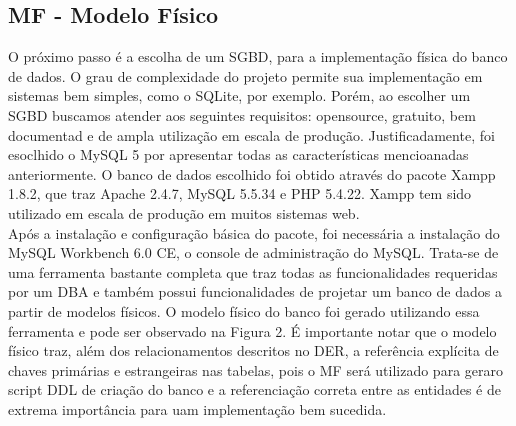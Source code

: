 \documentclass[10pt]{article}
\begin{document}
\begin{multicols}{2}
\subsection{MF - Modelo Físico}
O próximo passo é a escolha de um SGBD, para a implementação física do banco de dados. O grau de complexidade do projeto permite sua implementação em sistemas bem simples, como o SQLite, por exemplo. Porém, ao escolher um SGBD buscamos atender aos seguintes requisitos: opensource, gratuito, bem documentad e de ampla utilização em escala de produção. Justificadamente, foi esoclhido o MySQL 5 por apresentar todas as características mencioanadas anteriormente. O banco de dados escolhido foi obtido através do pacote Xampp 1.8.2, que traz Apache 2.4.7, MySQL 5.5.34 e PHP 5.4.22. Xampp tem sido utilizado em escala de produção em muitos sistemas web. \\
Após a instalação e configuração básica do pacote, foi necessária a instalação do MySQL Workbench 6.0 CE, o console de administração do MySQL. Trata-se de uma ferramenta bastante completa que traz todas as funcionalidades requeridas por um DBA e também possui funcionalidades de projetar um banco de dados a partir de modelos físicos. O modelo físico do banco foi gerado utilizando essa ferramenta e pode ser observado na Figura 2. É importante notar que o modelo físico traz, além dos relacionamentos descritos no DER, a referência explícita de chaves primárias e estrangeiras nas tabelas, pois o MF será utilizado para geraro script DDL de criação do banco e a referenciação correta entre as entidades é de extrema importância para uam implementação bem sucedida.

 \end{multicols} 
\end{document}
